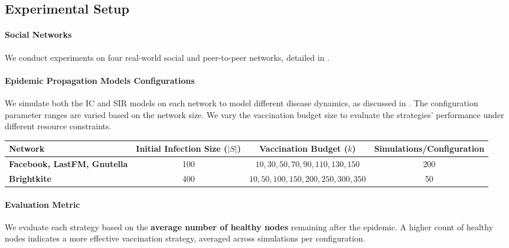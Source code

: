 \documentclass[9pt]{extarticle}
\begin{document}
\subsection{Experimental Setup}

\paragraph{Social Networks}

We conduct experiments on four real-world social and peer-to-peer networks, detailed in .

\paragraph{Epidemic Propagation Models Configurations}

We simulate both the IC and SIR models on each network to model different disease dynamics, as discussed in . The configuration parameter ranges are varied based on the network size. We vary the vaccination budget size to evaluate the strategies' performance under different resource constraints.

\vspace{-0.2cm}
\begin{table}[H]
    \centering
    \begin{tabular}{|l|c|c|c|}
        \hline
        \textbf{Network} & \textbf{Initial Infection Size ($|S|$)} & \textbf{Vaccination Budget ($k$)} & \textbf{Simulations/Configuration} \\ \hline
        \textbf{Facebook, LastFM, Gnutella} & 100 & $10, 30, 50, 70, 90, 110, 130, 150$ & 200 \\ \hline
        \textbf{Brightkite} & 400 & $10, 50, 100, 150, 200, 250, 300, 350$ & 50 \\ \hline
    \end{tabular}
\end{table}

\vspace{-0.3cm}
\paragraph{Evaluation Metric}

We evaluate each strategy based on the \textbf{average number of healthy nodes} remaining after the epidemic. A higher count of healthy nodes indicates a more effective vaccination strategy, averaged across simulations per configuration.
\end{document}
